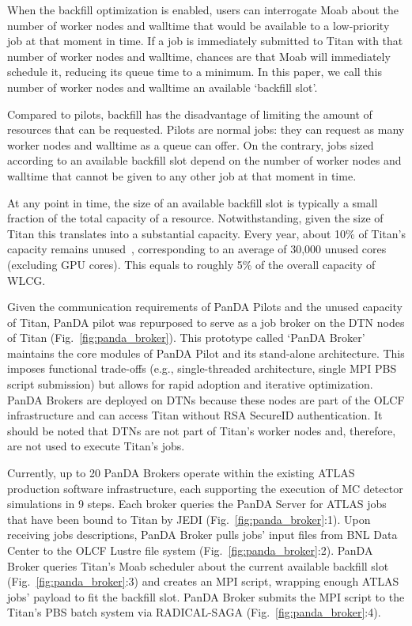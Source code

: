 When the backfill optimization is enabled, users can interrogate Moab about
the number of worker nodes and walltime that would be available to a
low-priority job at that moment in time. If a job is immediately submitted to
Titan with that number of worker nodes and walltime, chances are that Moab
will immediately schedule it, reducing its queue time to a minimum. In this
paper, we call this number of worker nodes and walltime an available
`backfill slot'.

Compared to pilots, backfill has the disadvantage of limiting the amount of
resources that can be requested. Pilots are normal jobs: they can request as
many worker nodes and walltime as a queue can offer. On the contrary, jobs
sized according to an available backfill slot depend on the number of worker
nodes and walltime that cannot be given to any other job at that moment in
time.

At any point in time, the size of an available backfill slot is typically a
small fraction of the total capacity of a resource. Notwithstanding, given
the size of Titan this translates into a substantial capacity. Every year,
about 10\% of Titan's capacity remains unused~\cite{barker2016us},
corresponding to an average of 30,000 unused cores (excluding GPU cores).
This equals to roughly 5\% of the overall capacity of WLCG\@.

Given the communication requirements of PanDA Pilots and the unused capacity
of Titan, PanDA pilot was repurposed to serve as a job broker on the DTN
nodes of Titan (Fig.~\ref{fig:panda_broker}). This prototype called `PanDA
Broker' maintains the core modules of PanDA Pilot and its stand-alone
architecture. This imposes functional trade-offs (e.g., single-threaded
architecture, single MPI PBS script submission) but allows for rapid adoption
and iterative optimization. PanDA Brokers are deployed on DTNs because these
nodes are part of the OLCF infrastructure and can access Titan without RSA
SecureID authentication. It should be noted that DTNs are not part of Titan's
worker nodes and, therefore, are not used to execute Titan's jobs.

Currently, up to 20 PanDA Brokers operate within the existing ATLAS
production software infrastructure, each supporting the execution of MC
detector simulations in 9 steps. Each broker queries the PanDA Server for
ATLAS jobs that have been bound to Titan by JEDI
(Fig.~\ref{fig:panda_broker}:1). Upon receiving jobs descriptions, PanDA
Broker pulls jobs' input files from BNL Data Center to the OLCF Lustre file
system (Fig.~\ref{fig:panda_broker}:2). PanDA Broker queries Titan's Moab
scheduler about the current available backfill slot
(Fig.~\ref{fig:panda_broker}:3) and creates an MPI script, wrapping enough
ATLAS jobs' payload to fit the backfill slot. PanDA Broker submits the MPI
script to the Titan's PBS batch system via RADICAL-SAGA
(Fig.~\ref{fig:panda_broker}:4).

